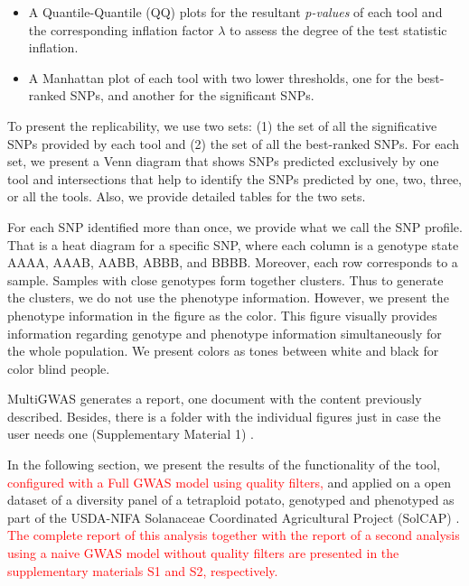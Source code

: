 \documentclass{article}
\begin{document}
\begin{itemize}
\item A Quantile-Quantile (QQ) plots for the resultant \emph{p-values} of each tool and the corresponding inflation factor $\lambda$ to assess the degree of the test statistic inflation. 
\item A Manhattan plot of each tool with two lower thresholds, one for the best-ranked SNPs, and another for the significant SNPs. 
\end{itemize}
To present the replicability, we use two sets: (1) the set of all the significative SNPs provided by each tool and (2) the set of all the best-ranked SNPs. For each set, we present a Venn diagram that shows SNPs predicted exclusively by one tool and intersections that help to identify the SNPs predicted by one, two, three, or all the tools. Also, we provide detailed tables for the two sets.

For each SNP identified more than once, we provide what we call the SNP profile. That is a heat diagram for a specific SNP, where each column is a genotype state AAAA, AAAB, AABB, ABBB, and BBBB. Moreover, each row corresponds to a sample. Samples with close genotypes form together clusters. Thus to generate the clusters, we do not use the phenotype information. However, we present the phenotype information in the figure as the color. This figure visually provides information regarding genotype and phenotype information simultaneously for the whole population. We present colors as tones between white and black for color blind people.



MultiGWAS generates a report, one document with the content previously described. Besides, there is a folder with the individual figures just in case the user needs one (Supplementary Material 1) .


In the following section, we present the results of the functionality of the tool,\textcolor{red}{{} configured with a Full GWAS model using quality filters,} and applied on a open dataset of a diversity panel of a tetraploid potato, genotyped and phenotyped as part of the USDA-NIFA Solanaceae Coordinated Agricultural Project (SolCAP) \cite{Hirsch2013}. \textcolor{red}{The complete report of this analysis together with the report of a second analysis using a naive GWAS model without quality filters are presented in the supplementary materials S1 and S2, respectively.}
\end{document}

